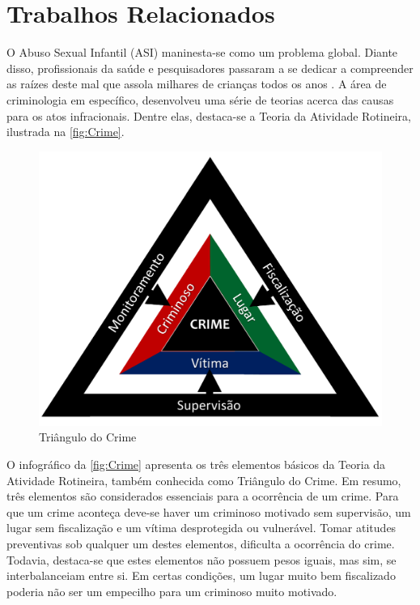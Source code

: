 \chapter{Trabalhos Relacionados}\label{ch:Relacionados}


O Abuso Sexual Infantil (ASI) maninesta-se como um problema global. Diante disso, profissionais da saúde e pesquisadores passaram a se dedicar a compreender as raízes  deste mal que assola milhares de crianças todos os anos \cite{deslandes1994atenccao, dahlberg2006violencia, da2017violencia}. A área de criminologia em específico, desenvolveu uma série de teorias acerca das causas para os atos infracionais. Dentre elas, destaca-se a Teoria da Atividade Rotineira, ilustrada na \autoref{fig:Crime}.

\begin{figure}
  \caption{\label{fig:Crime}Triângulo do Crime}
      \begin{center}
        \includegraphics[width=\linewidth]{./Figuras/TrianguloCrime.pdf}
      \end{center}
\end{figure}

O infográfico da \autoref{fig:Crime} apresenta os três elementos básicos da Teoria da Atividade Rotineira, também conhecida como Triângulo do Crime. Em resumo, três elementos são considerados essenciais para a ocorrência de um crime. Para que um crime aconteça deve-se haver um criminoso motivado sem supervisão, um lugar sem fiscalização e um vítima desprotegida ou vulnerável. Tomar atitudes preventivas sob qualquer um destes elementos, dificulta a ocorrência do crime. Todavia, destaca-se que estes elementos não possuem pesos iguais, mas sim, se interbalanceiam entre si. Em certas condições, um lugar muito bem fiscalizado poderia não ser um empecilho para um criminoso muito motivado.



